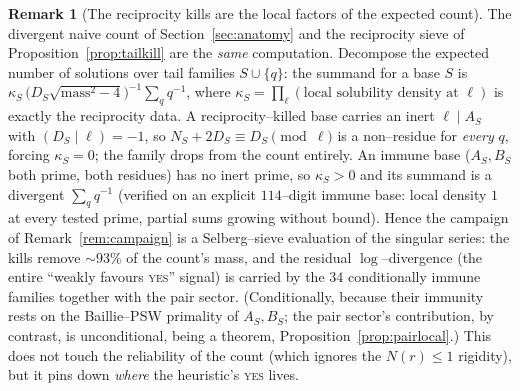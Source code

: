 \documentclass[11pt]{article}
\theoremstyle{definition}
\newtheorem{remark}[theorem]{Remark}
\begin{document}
\begin{remark}[The reciprocity kills are the local factors of the expected count]\label{rem:killcount}
The divergent naive count of Section~\ref{sec:anatomy} and the reciprocity sieve of
Proposition~\ref{prop:tailkill} are the \emph{same} computation. Decompose the expected number of
solutions over tail families $S\cup\{q\}$: the summand for a base $S$ is
$\kappa_S\,\bigl(D_S\sqrt{\mathrm{mass}^2-4}\bigr)^{-1}\sum_q q^{-1}$, where
$\kappa_S=\prod_\ell(\text{local solubility density at }\ell)$ is exactly the reciprocity data.
A reciprocity--killed base carries an inert $\ell\mid A_S$ with $(D_S\mid\ell)=-1$, so
$N_S+2D_S\equiv D_S\pmod\ell$ is a non--residue for \emph{every} $q$, forcing $\kappa_S=0$; the
family drops from the count entirely. An immune base ($A_S,B_S$ both prime, both residues) has no
inert prime, so $\kappa_S>0$ and its summand is a divergent $\sum_q q^{-1}$ (verified on an explicit
$114$--digit immune base: local density $1$ at every tested prime, partial sums growing without
bound). Hence the campaign of Remark~\ref{rem:campaign} is a Selberg--sieve evaluation of the
singular series: the kills remove ${\sim}93\%$ of the count's mass, and the residual
$\log$--divergence (the entire ``weakly favours \textsc{yes}'' signal) is carried by the $34$
conditionally immune families together with the pair sector. (Conditionally, because their immunity
rests on the Baillie--PSW primality of $A_S,B_S$; the pair sector's contribution, by contrast, is
unconditional, being a theorem, Proposition~\ref{prop:pairlocal}.) This does not touch the reliability of the
count (which ignores the $N(r)\le1$ rigidity), but it pins down \emph{where} the heuristic's
\textsc{yes} lives.
\end{remark}
\end{document}
